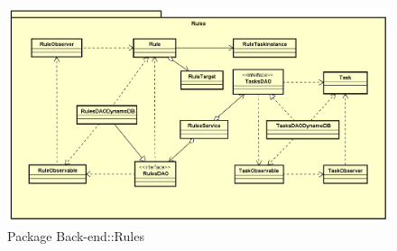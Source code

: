 \begin{figure}[h] \centering \includegraphics[width=\textwidth,height=\textheight,keepaspectratio]{images/diagrams/back-end/Official_Backend_0304/Rules.png}
	\caption{Package Back-end::Rules}
\end{figure}

